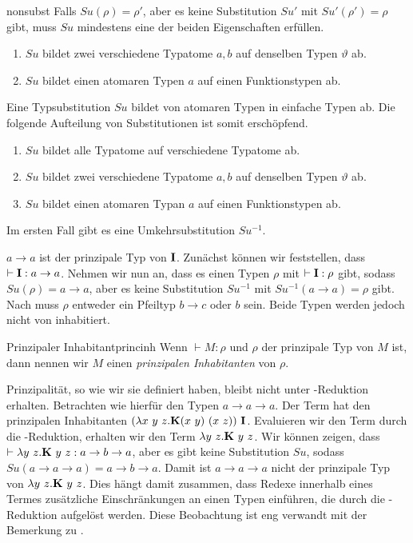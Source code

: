 \begin{lemma}{}{nonsubst}
    Falls $Su(\rho) = \rho'$, aber es keine Substitution $Su'$ mit $Su'(\rho') = \rho$ gibt, muss $Su$ mindestens eine der beiden Eigenschaften erfüllen.
    \begin{enumerate}
        \item $Su$ bildet zwei verschiedene Typatome $a, b$ auf denselben Typen $\vartheta$ ab.
        \item $Su$ bildet einen atomaren Typen $a$ auf einen Funktionstypen ab.
    \end{enumerate}
\Proof
Eine Typsubstitution $Su$ bildet von atomaren Typen in einfache Typen ab. Die folgende Aufteilung von Substitutionen ist somit erschöpfend.
\begin{enumerate}
        \item $Su$ bildet alle Typatome auf verschiedene Typatome ab.
        \item $Su$ bildet zwei verschiedene Typatome $a, b$ auf denselben Typen $\vartheta$ ab.
        \item $Su$ bildet einen atomaren Typan $a$ auf einen Funktionstypen ab.
\end{enumerate}
Im ersten Fall gibt es eine Umkehrsubstitution $Su^{-1}$. 
\end{lemma}

\begin{example}{}{}
    $a\to a$ ist der prinzipale Typ von $\textbf{I}$.
    \Proof
    Zunächst können wir feststellen, dass $\vdash \textbf{I}:a\to a$. Nehmen wir nun an, dass es einen Typen $\rho$ mit $\vdash \textbf{I} : \rho$ gibt, sodass $Su(\rho) = a \to a$, aber es keine Substitution $Su^{-1}$ mit $Su^{-1}(a \to a) = \rho$ gibt. Nach  muss $\rho$ entweder ein Pfeiltyp $b\to c$ oder $b$ sein. Beide Typen werden jedoch nicht von \tI{} inhabitiert.
\end{example}

\begin{definition}{Prinzipaler Inhabitant}{princinh}
    Wenn $\vdash M:\rho$ und $\rho$ der prinzipale Typ von $M$ ist, dann nennen wir $M$ einen \emph{prinzipalen Inhabitanten} von $\rho$.
\end{definition}

Prinzipalität, so wie wir sie definiert haben, bleibt nicht unter \tbeta-Reduktion erhalten. Betrachten wie hierfür den Typen $a\to a\to a$. Der Term hat den prinzipalen Inhabitanten $(\lambda x~y~z.\textbf{K}(x~y)~(x~z))~\textbf{I}$\cite[S. 177]{Hindley2008}. Evaluieren wir den Term durch die \tbeta-Reduktion, erhalten wir den Term $\lambda y~z.\textbf{K}~y~z$. Wir können zeigen, dass $\vdash \lambda y~z.\textbf{K}~y~z : a \to b \to a$, aber es gibt keine Substitution $Su$, sodass $Su(a\to a\to a) = a \to b \to a$. Damit ist $a \to a \to a$ nicht der prinzipale Typ von $\lambda y~z.\textbf{K}~y~z$. Dies hängt damit zusammen, dass Redexe innerhalb eines Termes zusätzliche Einschränkungen an einen Typen einführen, die durch die \tbeta-Reduktion aufgelöst werden. Diese Beobachtung ist eng verwandt mit der Bemerkung zu .

